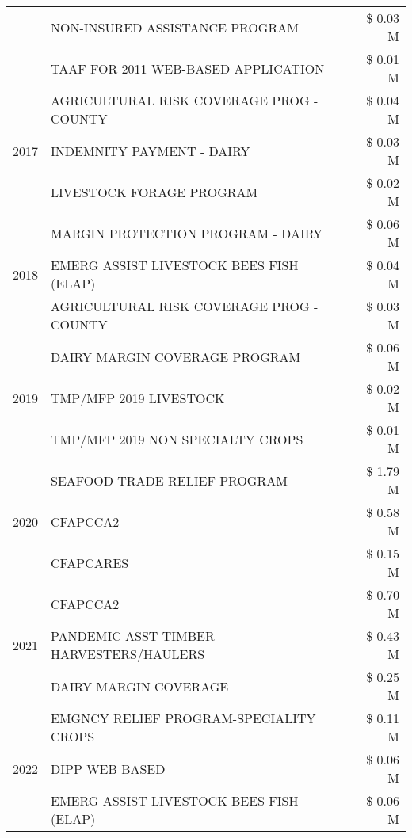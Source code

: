 \begin{tabular}{llr}
 & NON-INSURED ASSISTANCE PROGRAM & \$ 0.03 M \\
 & TAAF FOR 2011 WEB-BASED APPLICATION & \$ 0.01 M \\
\cline{1-3}
\multirow[t]{3}{*}{2017} & AGRICULTURAL RISK COVERAGE PROG - COUNTY & \$ 0.04 M \\
 & INDEMNITY PAYMENT - DAIRY & \$ 0.03 M \\
 & LIVESTOCK FORAGE PROGRAM & \$ 0.02 M \\
\cline{1-3}
\multirow[t]{3}{*}{2018} & MARGIN PROTECTION PROGRAM - DAIRY & \$ 0.06 M \\
 & EMERG ASSIST LIVESTOCK BEES FISH (ELAP) & \$ 0.04 M \\
 & AGRICULTURAL RISK COVERAGE PROG - COUNTY & \$ 0.03 M \\
\cline{1-3}
\multirow[t]{3}{*}{2019} & DAIRY MARGIN COVERAGE PROGRAM & \$ 0.06 M \\
 & TMP/MFP 2019 LIVESTOCK & \$ 0.02 M \\
 & TMP/MFP 2019 NON SPECIALTY CROPS & \$ 0.01 M \\
\cline{1-3}
\multirow[t]{3}{*}{2020} & SEAFOOD TRADE RELIEF PROGRAM & \$ 1.79 M \\
 & CFAPCCA2 & \$ 0.58 M \\
 & CFAPCARES & \$ 0.15 M \\
\cline{1-3}
\multirow[t]{3}{*}{2021} & CFAPCCA2 & \$ 0.70 M \\
 & PANDEMIC ASST-TIMBER HARVESTERS/HAULERS & \$ 0.43 M \\
 & DAIRY MARGIN COVERAGE & \$ 0.25 M \\
\cline{1-3}
\multirow[t]{3}{*}{2022} & EMGNCY RELIEF PROGRAM-SPECIALITY CROPS & \$ 0.11 M \\
 & DIPP WEB-BASED & \$ 0.06 M \\
 & EMERG ASSIST LIVESTOCK BEES FISH (ELAP) & \$ 0.06 M \\
\cline{1-3}
\bottomrule
\end{tabular}
